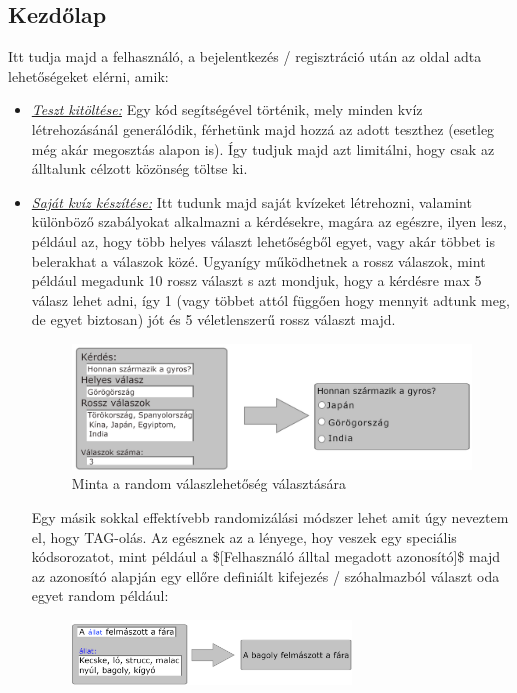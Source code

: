 \documentclass[a4paper,12pt]{article}
\begin{document}
\subsection{Kezdőlap}
Itt tudja majd a felhasználó, a bejelentkezés / regisztráció után az oldal adta lehetőségeket elérni, amik:
\begin{itemize}
	\item \textit{\underline{Teszt kitöltése:}} Egy kód segítségével történik, mely minden kvíz létrehozásánál generálódik, férhetünk majd hozzá az adott teszthez (esetleg még akár megosztás alapon is). Így tudjuk majd azt limitálni, hogy csak az álltalunk célzott közönség töltse ki.
	\item \textit{\underline{Saját kvíz készítése:}} Itt tudunk majd saját kvízeket létrehozni, valamint különböző szabályokat alkalmazni a kérdésekre, magára az egészre, ilyen lesz, például az, hogy több helyes választ lehetőségből egyet, vagy akár többet is belerakhat a válaszok közé. Ugyanígy működhetnek a rossz válaszok, mint például megadunk 10 rossz választ s azt mondjuk, hogy a kérdésre max 5 válasz lehet adni, így 1 (vagy többet attól függően hogy mennyit adtunk meg, de egyet biztosan) jót és 5 véletlenszerű rossz választ majd.
	\begin{figure}[h]
    		\centering
    		\includegraphics[width=1\textwidth]{MORE_QUEST.png}
    		\caption{Minta a random válaszlehetőség választására}
    \label{fig:Minta a random válaszlehetőség választására}
\end{figure}
Egy másik sokkal effektívebb randomizálási módszer lehet amit úgy neveztem el, hogy TAG-olás. Az egésznek az a lényege, hoy veszek egy speciális kódsorozatot, mint például a \$[Felhasználó álltal megadott azonosító]\$ majd az azonosító alapján egy ellőre definiált kifejezés / szóhalmazból választ oda egyet random például:
\begin{figure}[h]
    			\centering
    			\includegraphics[width=0.7\textwidth]{tag.png}

\end{figure}
\end{itemize}
\end{document}
